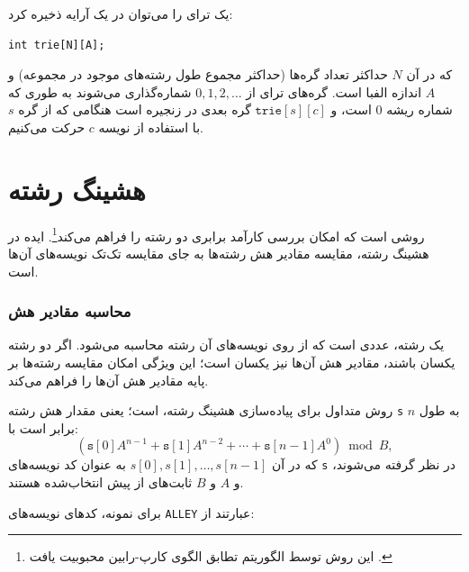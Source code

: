یک ترای را می‌توان در یک آرایه ذخیره کرد:
\begin{lstlisting}
int trie[N][A];
\end{lstlisting}
که در آن $N$ حداکثر تعداد گره‌ها
(حداکثر مجموع طول رشته‌های موجود در مجموعه)
و $A$ اندازه الفبا است.
گره‌های ترای از
$0,1,2,\ldots$ شماره‌گذاری می‌شوند به طوری که شماره ریشه 0 است،
و $\texttt{trie}[s][c]$ گره بعدی در زنجیره است
هنگامی که از گره $s$ با استفاده از نویسه $c$ حرکت می‌کنیم.

\section{هشینگ رشته}


 روشی است که
امکان بررسی کارآمد برابری دو رشته را
فراهم می‌کند\footnote{این روش
توسط الگوریتم تطابق الگوی کارپ-رابین محبوبیت یافت \cite{kar87}.}.
ایده در هشینگ رشته، مقایسه مقادیر هش
رشته‌ها به جای مقایسه تک‌تک نویسه‌های آن‌ها است.

\subsubsection*{محاسبه مقادیر هش}


 یک رشته،
عددی است که از روی نویسه‌های
آن رشته محاسبه می‌شود.
اگر دو رشته یکسان باشند،
مقادیر هش آن‌ها نیز یکسان است؛
این ویژگی امکان مقایسه رشته‌ها
بر پایه مقادیر هش آن‌ها را فراهم می‌کند.

روش متداول برای پیاده‌سازی هشینگ رشته،
 است؛ یعنی
مقدار هش رشته \texttt{s}
به طول $n$ برابر است با:
\[(\texttt{s}[0] A^{n-1} + \texttt{s}[1] A^{n-2} + \cdots + \texttt{s}[n-1] A^0) \bmod B  ,\]
که در آن $s[0],s[1],\ldots,s[n-1]$
به عنوان کد نویسه‌های \texttt{s} در نظر گرفته می‌شوند،
و $A$ و $B$ ثابت‌های از پیش انتخاب‌شده هستند.

برای نمونه، کدهای نویسه‌های
\texttt{ALLEY} عبارتند از:
\begin{center}
\end{center}

